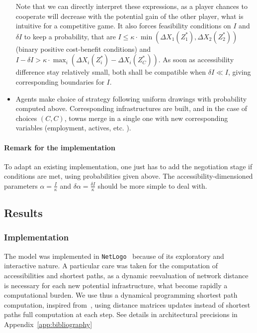 \begin{itemize}
Note that we can directly interpret these expressions, as a player chances to cooperate will decrease with the potential gain of the other player, what is intuitive for a competitive game. It also forces feasibility conditions on $I$ and $\delta I$ to keep a probability, that are $I \leq \kappa\cdot \min(\Delta X_1(Z^{\ast}_1),\Delta X_2(Z^{\ast}_2))$ (binary positive cost-benefit conditions) and $I-\delta I > \kappa \cdot \max_i (\Delta X_i(Z^{\ast}_i)-\Delta X_i(Z^{\ast}_C))$. As soon as accessibility difference stay relatively small, both shall be compatible when $\delta I \ll I$, giving corresponding boundaries for $I$.

\item Agents make choice of strategy following uniform drawings with probability computed above. Corresponding infrastructures are built, and in the case of choices $(C,C)$, towns merge in a single one with new corresponding variables (employment, actives, etc. ).


\end{itemize}



\paragraph{Remark for the implementation}

To adapt an existing implementation, one just has to add the negotiation stage if conditions are met, using probabilities given above. The accessibility-dimensioned parameters $\alpha = \frac{I}{\kappa}$ and $\delta \alpha = \frac{\delta I}{\kappa}$ should be more simple to deal with.




\subsection{Results}


\subsubsection{Implementation}

The model was implemented in \texttt{NetLogo}~\cite{wilensky1999netlogo} because of its exploratory and interactive nature. A particular care was taken for the computation of accessibilities and shortest paths, as a dynamic reevaluation of network distance is necessary for each new potential infrastructure, what become rapidly a computational burden. We use thus a dynamical programming shortest path computation, inspired from~\cite{tretyakov2011fast}, using distance matrices updates instead of shortest paths full computation at each step. See details in architectural precisions in Appendix~\ref{app:bibliography}



